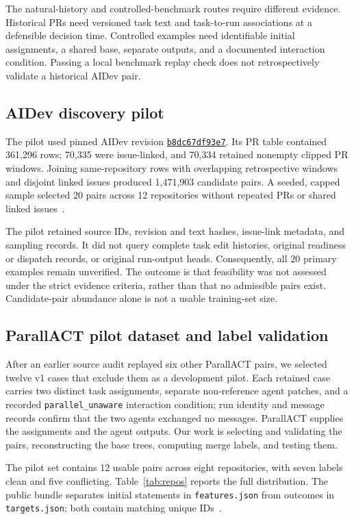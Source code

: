 \documentclass[sigconf,authorversion,nonacm]{acmart}
\begin{document}
The natural-history and controlled-benchmark routes require different evidence. Historical PRs need versioned task text and task-to-run associations at a defensible decision time. Controlled examples need identifiable initial assignments, a shared base, separate outputs, and a documented interaction condition. Passing a local benchmark replay check does not retrospectively validate a historical AIDev pair.

\subsection{AIDev discovery pilot}
The pilot used pinned AIDev revision \href{https://huggingface.co/datasets/hao-li/AIDev/tree/b8dc67df93e7c11f6f20c84129db7232eb1ec253}{\texttt{b8dc67df93e7}}. Its PR table contained 361,296 rows; 70,335 were issue-linked, and 70,334 retained nonempty clipped PR windows. Joining same-repository rows with overlapping retrospective windows and disjoint linked issues produced 1,471,903 candidate pairs. A seeded, capped sample selected 20 pairs across 12 repositories without repeated PRs or shared linked issues~\cite{pilotresults}.

The pilot retained source IDs, revision and text hashes, issue-link metadata, and sampling records. It did not query complete task edit histories, original readiness or dispatch records, or original run-output heads. Consequently, all 20 primary examples remain unverified. The outcome is that feasibility was not assessed under the strict evidence criteria, rather than that no admissible pairs exist. Candidate-pair abundance alone is not a usable training-set size.

\subsection{ParallACT pilot dataset and label validation}
After an earlier source audit replayed six other ParallACT pairs, we selected twelve v1 cases that exclude them as a development pilot. Each retained case carries two distinct task assignments, separate non-reference agent patches, and a recorded \texttt{parallel\_unaware} interaction condition; run identity and message records confirm that the two agents exchanged no messages. ParallACT supplies the assignments and the agent outputs. Our work is selecting and validating the pairs, reconstructing the base trees, computing merge labels, and testing them.

The pilot set contains 12 usable pairs across eight repositories, with seven labels clean and five conflicting. Table~\ref{tab:repos} reports the full distribution. The public bundle separates initial statements in \texttt{features.json} from outcomes in \texttt{targets.json}; both contain matching unique IDs~\cite{recoveryresults,publicdataset}.
\end{document}
